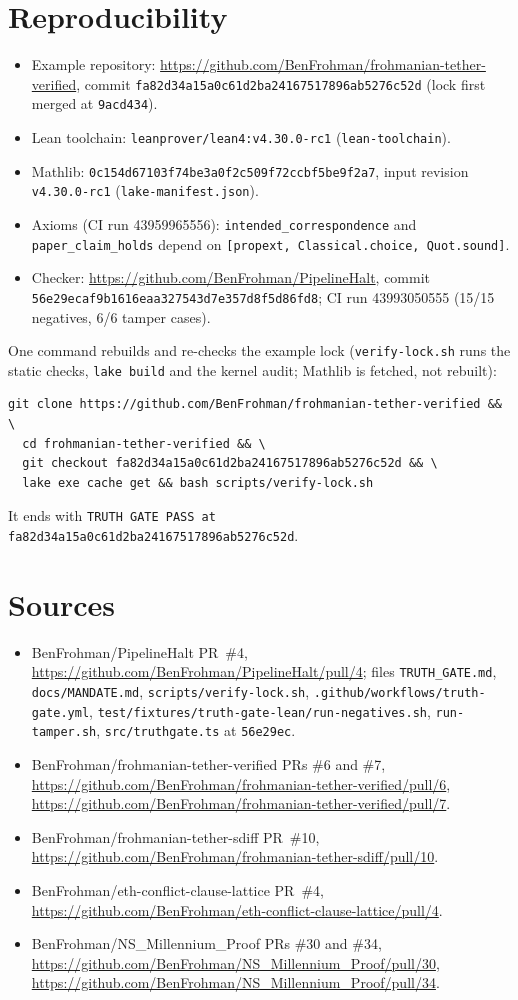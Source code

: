 \documentclass[11pt,a4paper]{article}
\newcommand{\code}[1]{\texttt{#1}}
\begin{document}
\section{Reproducibility}
\begin{itemize}
\item Example repository: \url{https://github.com/BenFrohman/frohmanian-tether-verified}, commit
  \code{fa82d34a15a0c61d2ba24167517896ab5276c52d} (lock first merged at \code{9acd434}).
\item Lean toolchain: \code{leanprover/lean4:v4.30.0-rc1} (\code{lean-toolchain}).
\item Mathlib: \code{0c154d67103f74be3a0f2c509f72ccbf5be9f2a7}, input revision
  \code{v4.30.0-rc1} (\code{lake-manifest.json}).
\item Axioms (CI run 43959965556): \code{intended\_correspondence} and
  \code{paper\_claim\_holds} depend on \code{[propext, Classical.choice, Quot.sound]}.
\item Checker: \url{https://github.com/BenFrohman/PipelineHalt}, commit
  \code{56e29ecaf9b1616eaa327543d7e357d8f5d86fd8}; CI run 43993050555 (15/15 negatives,
  6/6 tamper cases).
\end{itemize}
One command rebuilds and re-checks the example lock (\code{verify-lock.sh} runs the static
checks, \code{lake build} and the kernel audit; Mathlib is fetched, not rebuilt):
\begin{Verbatim}
git clone https://github.com/BenFrohman/frohmanian-tether-verified && \
  cd frohmanian-tether-verified && \
  git checkout fa82d34a15a0c61d2ba24167517896ab5276c52d && \
  lake exe cache get && bash scripts/verify-lock.sh
\end{Verbatim}
It ends with \code{TRUTH GATE PASS at fa82d34a15a0c61d2ba24167517896ab5276c52d}.

\section*{Sources}
\small
\begin{itemize}
\item BenFrohman/PipelineHalt PR~\#4, \url{https://github.com/BenFrohman/PipelineHalt/pull/4};
  files \code{TRUTH\_GATE.md}, \code{docs/MANDATE.md}, \code{scripts/verify-lock.sh},
  \code{.github/workflows/truth-gate.yml}, \code{test/fixtures/truth-gate-lean/run-negatives.sh},
  \code{run-tamper.sh}, \code{src/truthgate.ts} at \code{56e29ec}.
\item BenFrohman/frohmanian-tether-verified PRs \#6 and \#7,
  \url{https://github.com/BenFrohman/frohmanian-tether-verified/pull/6},
  \url{https://github.com/BenFrohman/frohmanian-tether-verified/pull/7}.
\item BenFrohman/frohmanian-tether-sdiff PR~\#10,
  \url{https://github.com/BenFrohman/frohmanian-tether-sdiff/pull/10}.
\item BenFrohman/eth-conflict-clause-lattice PR~\#4,
  \url{https://github.com/BenFrohman/eth-conflict-clause-lattice/pull/4}.
\item BenFrohman/NS\_Millennium\_Proof PRs \#30 and \#34,
  \url{https://github.com/BenFrohman/NS_Millennium_Proof/pull/30},
  \url{https://github.com/BenFrohman/NS_Millennium_Proof/pull/34}.
\end{itemize}
\end{document}
